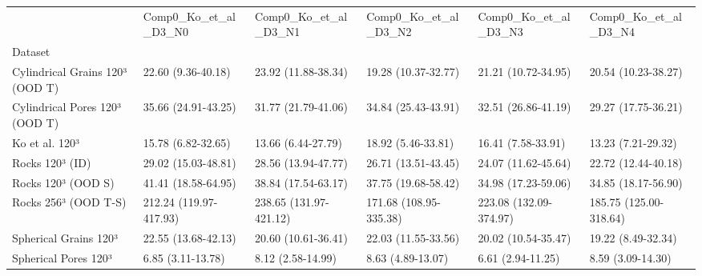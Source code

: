 \begin{tabular}{llllll}
\toprule
 & Comp0_Ko_et_al_D3_N0 & Comp0_Ko_et_al_D3_N1 & Comp0_Ko_et_al_D3_N2 & Comp0_Ko_et_al_D3_N3 & Comp0_Ko_et_al_D3_N4 \\
Dataset &  &  &  &  &  \\
\midrule
Cylindrical Grains 120³ (OOD T) & 22.60 (9.36-40.18) & 23.92 (11.88-38.34) & 19.28 (10.37-32.77) & 21.21 (10.72-34.95) & 20.54 (10.23-38.27) \\
Cylindrical Pores 120³ (OOD T) & 35.66 (24.91-43.25) & 31.77 (21.79-41.06) & 34.84 (25.43-43.91) & 32.51 (26.86-41.19) & 29.27 (17.75-36.21) \\
Ko et al. 120³ & 15.78 (6.82-32.65) & 13.66 (6.44-27.79) & 18.92 (5.46-33.81) & 16.41 (7.58-33.91) & 13.23 (7.21-29.32) \\
Rocks 120³ (ID) & 29.02 (15.03-48.81) & 28.56 (13.94-47.77) & 26.71 (13.51-43.45) & 24.07 (11.62-45.64) & 22.72 (12.44-40.18) \\
Rocks 120³ (OOD S) & 41.41 (18.58-64.95) & 38.84 (17.54-63.17) & 37.75 (19.68-58.42) & 34.98 (17.23-59.06) & 34.85 (18.17-56.90) \\
Rocks 256³ (OOD T-S) & 212.24 (119.97-417.93) & 238.65 (131.97-421.12) & 171.68 (108.95-335.38) & 223.08 (132.09-374.97) & 185.75 (125.00-318.64) \\
Spherical Grains 120³ & 22.55 (13.68-42.13) & 20.60 (10.61-36.41) & 22.03 (11.55-33.56) & 20.02 (10.54-35.47) & 19.22 (8.49-32.34) \\
Spherical Pores 120³ & 6.85 (3.11-13.78) & 8.12 (2.58-14.99) & 8.63 (4.89-13.07) & 6.61 (2.94-11.25) & 8.59 (3.09-14.30) \\
\bottomrule
\end{tabular}
